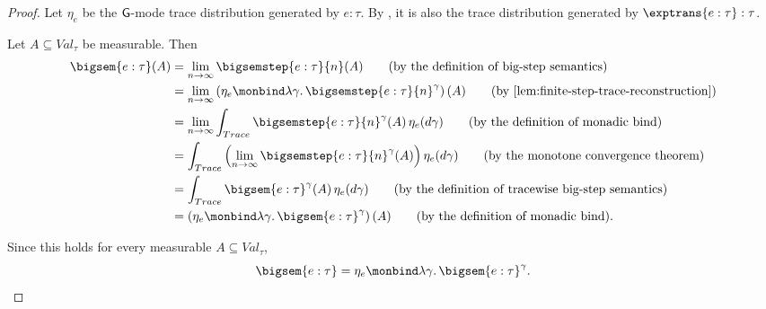 \begin{proof}
  Let $\eta_e$ be the $\mathsf{G}$-mode trace distribution generated by $e:\tau$.
  By , it is also the trace
  distribution generated by $\exptrans{e:\tau}:\tau$.

  Let $A\subseteq Val_\tau$ be measurable. Then
  \begin{align}
    \bigsem{e:\tau}(A)
    &=
    \lim_{n\to\infty}
    \bigsemstep{e:\tau}{n}(A)
    \tag{\text{by the definition of big-step semantics}}
    \\
    &=
    \lim_{n\to\infty}
    \left(
      \eta_e
      \monbind
      \lambda\gamma.\,
      \bigsemstep{e:\tau}{n}^{\gamma}
    \right)(A)
    \tag{\text{by \Cref{lem:finite-step-trace-reconstruction}}}
    \\
    &=
    \lim_{n\to\infty}
    \int_{Trace}
      \bigsemstep{e:\tau}{n}^{\gamma}(A)\,
      \eta_e(d\gamma)
    \tag{\text{by the definition of monadic bind}}
    \\
    &=
    \int_{Trace}
      \left(
        \lim_{n\to\infty}
        \bigsemstep{e:\tau}{n}^{\gamma}(A)
      \right)
      \eta_e(d\gamma)
    \tag{\text{by the monotone convergence theorem}}
    \\
    &=
    \int_{Trace}
      \bigsem{e:\tau}^{\gamma}(A)\,
      \eta_e(d\gamma)
    \tag{\text{by the definition of tracewise big-step semantics}}
    \\
    &=
    \left(
      \eta_e
      \monbind
      \lambda\gamma.\,
      \bigsem{e:\tau}^{\gamma}
    \right)(A)
    \tag{\text{by the definition of monadic bind}}.
  \end{align}

  Since this holds for every measurable $A\subseteq Val_\tau$,
  \[
    \bigsem{e:\tau}
    =
    \eta_e
    \monbind
    \lambda\gamma.\,
    \bigsem{e:\tau}^{\gamma}.
  \]


\end{proof}
